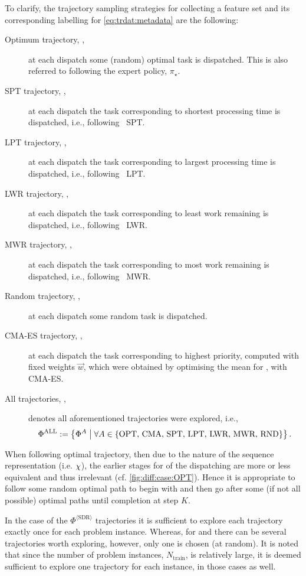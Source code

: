 To clarify, the trajectory sampling strategies for collecting a feature set and 
its corresponding labelling for \cref{eq:trdat:metadata} are the following:
\begin{description}
    \item[Optimum trajectory, ,] at each dispatch some (random) 
    optimal task is dispatched. This is also referred to following the expert 
    policy, $\pi_\star$.
    \item[SPT trajectory, ,] at each dispatch the task 
    corresponding to shortest processing time is dispatched, i.e., following 
    \sdr~SPT.
    \item[LPT trajectory, ,] at each dispatch the task 
    corresponding to largest processing time is dispatched, i.e., following 
    \sdr~LPT.
    \item[LWR trajectory, ,] at each dispatch the task 
    corresponding to least work remaining is dispatched, i.e., following 
    \sdr~LWR.
    \item[MWR trajectory, ,] at each dispatch the task 
    corresponding to most work remaining is dispatched, i.e., following 
    \sdr~MWR.
    \item[Random trajectory, ,] at each dispatch some random task 
    is dispatched.
    \item[CMA-ES trajectory, ,] at each dispatch the task 
    corresponding to highest priority, computed with fixed weights $\vec{w}$, 
    which were obtained by optimising the mean for \fullnamerho, with CMA-ES. 
    \item[All trajectories, ,] denotes all aforementioned 
    trajectories were explored, i.e., 
    \begin{equation}
    \Phi^{\text{ALL}}:=\left\{\Phi^{A}\;\middle|\;\forall A \in 
    \{\text{OPT,~CMA,~SPT,~LPT,~LWR,~MWR,~RND}\}\right\}.
    \end{equation}
\end{description}

When following optimal trajectory, then due to the nature of the sequence 
representation (i.e. ${\mathbf{\chi}}$), the earlier stages for  of the 
dispatching are more or less equivalent and thus irrelevant (cf. 
\cref{fig:diff:case:OPT}). 
Hence it is appropriate to follow some random optimal path to begin with and 
then go after some (if not all possible) optimal paths until completion at step 
$K$. 

In the case of the $\Phi^{\langle \text{SDR} \rangle}$ trajectories it is 
sufficient to explore each trajectory exactly once for each problem instance. 
Whereas, for  and  there can be several 
trajectories worth exploring, however, only one is chosen (at random). It is 
noted that since the number of problem instances, $N_{\text{train}}$, is 
relatively large, it is deemed sufficient to explore one trajectory for each 
instance, in those cases as well.

